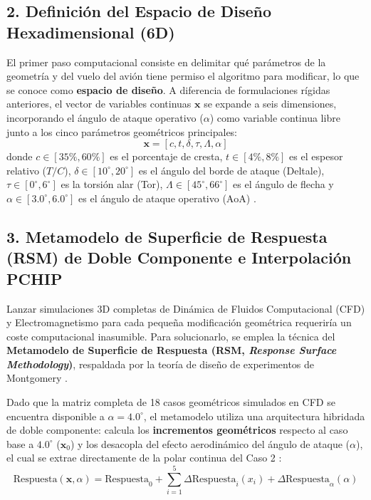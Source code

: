 \documentclass[11pt, a4paper]{article}
\begin{document}
\subsection*{2. Definición del Espacio de Diseño Hexadimensional (6D)}
El primer paso computacional consiste en delimitar qué parámetros de la geometría y del vuelo del avión tiene permiso el algoritmo para modificar, lo que se conoce como \textbf{espacio de diseño}. A diferencia de formulaciones rígidas anteriores, el vector de variables continuas $\mathbf{x}$ se expande a seis dimensiones, incorporando el ángulo de ataque operativo ($\alpha$) como variable continua libre junto a los cinco parámetros geométricos principales:
\begin{equation}
    \mathbf{x} = [c, t, \delta, \tau, \Lambda, \alpha]
\end{equation}
donde $c \in [35\%, 60\%]$ es el porcentaje de cresta, $t \in [4\%, 8\%]$ es el espesor relativo ($T/C$), $\delta \in [10^\circ, 20^\circ]$ es el ángulo del borde de ataque (Deltale), $\tau \in [0^\circ, 6^\circ]$ es la torsión alar (Tor), $\Lambda \in [45^\circ, 66^\circ]$ es el ángulo de flecha y $\alpha \in [3.0^\circ, 6.0^\circ]$ es el ángulo de ataque operativo ($\text{AoA}$) \cite{raymer, anderson}.

\subsection*{3. Metamodelo de Superficie de Respuesta (RSM) de Doble Componente e Interpolación PCHIP}
Lanzar simulaciones 3D completas de Dinámica de Fluidos Computacional (CFD) y Electromagnetismo para cada pequeña modificación geométrica requeriría un coste computacional inasumible. Para solucionarlo, se emplea la técnica del \textbf{Metamodelo de Superficie de Respuesta (RSM, \textit{Response Surface Methodology})}, respaldada por la teoría de diseño de experimentos de Montgomery \cite{montgomery}. 

Dado que la matriz completa de 18 casos geométricos simulados en CFD se encuentra disponible a $\alpha = 4.0^\circ$, el metamodelo utiliza una arquitectura hibridada de doble componente: calcula los \textbf{incrementos geométricos} respecto al caso base a $4.0^\circ$ ($\mathbf{x}_0$) y los desacopla del efecto aerodinámico del ángulo de ataque ($\alpha$), el cual se extrae directamente de la polar continua del Caso 2 \cite{montgomery, anderson}:
\begin{equation}
    \text{Respuesta}(\mathbf{x}, \alpha) = \text{Respuesta}_0 + \sum_{i=1}^{5} \Delta \text{Respuesta}_i(x_i) + \Delta \text{Respuesta}_{\alpha}(\alpha)
\end{equation}
\end{document}
